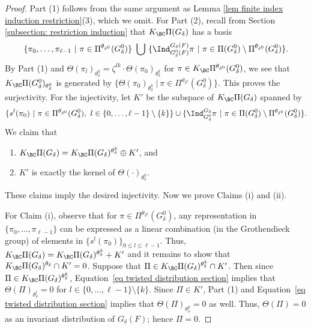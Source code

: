 \documentclass[11pt,letterpaper]{amsart}
\numberwithin{equation}{section}
\begin{document}
\begin{proof}
Part (1) follows from the same argument as Lemma \ref{lem finite index induction restriction}(3), which we omit. For Part (2), recall from Section \ref{subsection: restriction induction} that $K_{\BC}\Pi(G_{\delta})$ has a basis 
\[
    \{
    \pi_0,\ldots,\pi_{\ell-1} \ \vert\ \pi\in \Pi^{\theta_{\delta^0}}(G^0_{\delta})
    \} 
\ \bigcup \ 
    \{
    \Ind_{G_\delta^0(F)}^{G_\delta(F)} \pi \ \vert\ \pi \in \Pi(G_\delta^0) \setminus \Pi^{\theta_{\delta^0}}(G^0_{\delta})
    \}.
\]
By Part (1) and  $\Theta(\pi_l)_{\theta_\delta^k}= \zeta^{lk}\cdot \Theta(\pi_0)_{\theta_\delta^k}$ for $\pi \in K_{\BC}\Pi^{\theta_{\delta^0}}(G^0_{\delta})$, we see that $K_{\BC}\Pi(G^0_{\delta})_{\theta_\delta^k}$ is generated by $\{\Theta(\pi_0)_{\theta_\delta^k}\ \vert\ \pi \in \Pi^{\theta_{\delta^0}}(G^0_{\delta})\}$. This proves the surjectivity. For the injectivity, let $ K'$ be the subspace of $K_{\BC}\Pi(G_{\delta})$ spanned by 
\[
    \{
    s^{l}(\pi_0)
        \ \vert\ 
    \pi \in \Pi^{\theta_{\delta^0}}(G^0_{\delta}),\ l \in \{0,\ldots, \ell-1\}\setminus \{k\}
    \} 
\cup 
    \{
    \Ind_{G^0_{\delta}}^{G_{\delta}} \pi
        \ \vert\ 
    \pi \in \Pi(G^0_{\delta}) \setminus \Pi^{\theta_{\delta^0}}(G^0_{\delta})
    \}.
\]
We claim that
\begin{enumerate}
    \item [(i)] 
    $ K_{\BC}\Pi(G_\delta)= K_{\BC}\Pi(G_\delta)^{\theta_\delta^k} \oplus K'$, and
    \item [(ii)] 
    $K'$ is exactly the kernel of $\Theta(\cdot)_{\theta_\delta^k}$.
\end{enumerate}
These claims imply the desired injectivity.
 Now we prove Claims (i) and (ii). 
 
 For Claim (i), observe that for $\pi \in \Pi^{\theta_{\delta^0}}(G_\delta^0)$, any representation in  $\{\pi_0,\ldots, \pi_{\ell-1}\}$ can be expressed as a linear combination (in the Grothendieck group) of elements in $\{s^l(\pi_0)\}_{0 \leq l \leq \ell-1}$. Thus, $ K_{\BC}\Pi(G_{\delta})= K_{\BC}\Pi(G_{\delta})^{\theta_\delta^k}+ K'
 $ and it remains to show that $K_{\BC}\Pi(G_{\delta})^{\theta_\delta} \cap K'= 0$. Suppose that $\Pi \in K_{\BC}\Pi(G_{\delta})^{\theta_\delta^k} \cap K'$. Then since $\Pi \in K_{\BC}\Pi(G_{\delta})^{\theta_\delta^k}$, Equation~\eqref{eq twisted distribution section} implies that $\Theta(\Pi)_{\theta_\delta^l}=0$ for $l\in \{0,\ldots, \ell-1\}\setminus \{k\}$. Since $\Pi \in K'$, Part (1) and Equation~\eqref{eq twisted distribution section} implies  that $\Theta(\Pi)_{\theta_\delta^k}=0$ as well. Thus, $\Theta(\Pi)=0$ as an invariant distribution of $G_{\delta}(F)$; hence $\Pi=0$. 
 

\end{proof}
\end{document}
